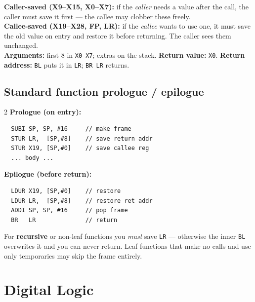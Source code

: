 \documentclass[10pt]{article}
\newcommand{\code}[1]{\texttt{\small #1}}
\begin{document}
\begin{formbox}
\textbf{Caller-saved (X9--X15, X0--X7):} if the \emph{caller} needs a value after the call, the
caller must save it first --- the callee may clobber these freely.\\
\textbf{Callee-saved (X19--X28, FP, LR):} if the \emph{callee} wants to use one, it must save the
old value on entry and restore it before returning. The caller sees them unchanged.\\
\textbf{Arguments:} first 8 in \code{X0--X7}; extras on the stack. \textbf{Return value:} \code{X0}.
\textbf{Return address:} \code{BL} puts it in \code{LR}; \code{BR LR} returns.
\end{formbox}

\subsection{Standard function prologue / epilogue}
\begin{multicols}{2}
\textbf{Prologue (on entry):}
\begin{lstlisting}
  SUBI SP, SP, #16     // make frame
  STUR LR,  [SP,#8]    // save return addr
  STUR X19, [SP,#0]    // save callee reg
  ... body ...
\end{lstlisting}
\columnbreak

\textbf{Epilogue (before return):}
\begin{lstlisting}
  LDUR X19, [SP,#0]    // restore
  LDUR LR,  [SP,#8]    // restore ret addr
  ADDI SP, SP, #16     // pop frame
  BR   LR              // return
\end{lstlisting}
\end{multicols}

\begin{pitbox}
For \textbf{recursive} or non-leaf functions you \emph{must} save \code{LR} --- otherwise the
inner \code{BL} overwrites it and you can never return. Leaf functions that make no calls and use
only temporaries may skip the frame entirely.
\end{pitbox}

\section{Digital Logic}
\end{document}
